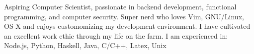 

\begin{cvparagraph}

Aspiring Computer Scientist, passionate in backend development, functional programming, 
and computer security. Super nerd who loves Vim, GNU/Linux, OS X and enjoys customomizing 
my development environment. 
I have cultivated an excellent work ethic through my life on the farm.
I am experienced in: Node.js, Python, Haskell, Java, C/C++, Latex, Unix 
\end{cvparagraph}
